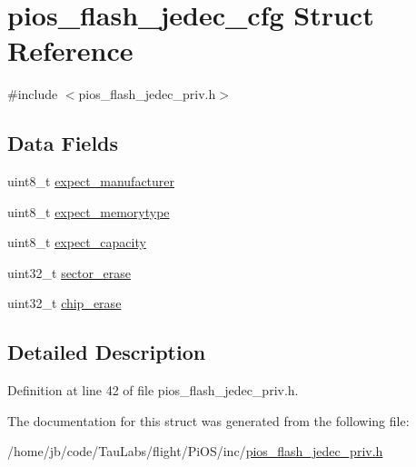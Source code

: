 \hypertarget{structpios__flash__jedec__cfg}{\section{pios\-\_\-flash\-\_\-jedec\-\_\-cfg \-Struct \-Reference}
\label{structpios__flash__jedec__cfg}
}


{\ttfamily \#include $<$pios\-\_\-flash\-\_\-jedec\-\_\-priv.\-h$>$}

\subsection*{\-Data \-Fields}
\begin{DoxyCompactItemize}
\item 
uint8\-\_\-t \hyperlink{group___p_i_o_s___f_l_a_s_h_gab7416f66a2c392cc5a27e12cbf4e9a07}{expect\-\_\-manufacturer}
\item 
uint8\-\_\-t \hyperlink{group___p_i_o_s___f_l_a_s_h_gacfb5714f6cef5d14a78a38ebe2369b43}{expect\-\_\-memorytype}
\item 
uint8\-\_\-t \hyperlink{group___p_i_o_s___f_l_a_s_h_ga33911ac74387cebdbc4bb2fe3d5541a6}{expect\-\_\-capacity}
\item 
uint32\-\_\-t \hyperlink{group___p_i_o_s___f_l_a_s_h_gae824eeb4a55e49fa84a48f1d43ae788c}{sector\-\_\-erase}
\item 
uint32\-\_\-t \hyperlink{group___p_i_o_s___f_l_a_s_h_ga24dfbff52821d42480cde7686f07e956}{chip\-\_\-erase}
\end{DoxyCompactItemize}


\subsection{\-Detailed \-Description}


\-Definition at line 42 of file pios\-\_\-flash\-\_\-jedec\-\_\-priv.\-h.



\-The documentation for this struct was generated from the following file\-:\begin{DoxyCompactItemize}
\item 
/home/jb/code/\-Tau\-Labs/flight/\-Pi\-O\-S/inc/\hyperlink{pios__flash__jedec__priv_8h}{pios\-\_\-flash\-\_\-jedec\-\_\-priv.\-h}\end{DoxyCompactItemize}
